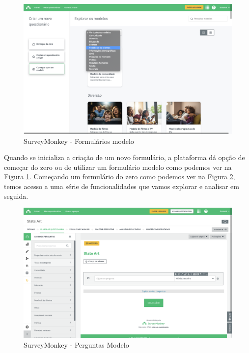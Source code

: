 \newpage

\begin{figure}[ht!]
	\begin{center}
		\includegraphics[width=1\textwidth]{img/sm/survey-form-create}
		\caption{SurveyMonkey - Formulários modelo }
		\label{fig:survey-form-create}
	\end{center}
\end{figure}

Quando se inicializa a criação de um novo formulário, a plataforma dá opção de começar do zero ou de utilizar um formulário modelo como podemos ver na Figura \ref{fig:survey-form-create}. Começando um formulário do zero como podemos ver na Figura \ref{fig:survey-form-banck2}, temos acesso a uma série de funcionalidades que vamos explorar e analisar em seguida.

\begin{figure}[ht!]
	\begin{center}
		\includegraphics[width=1\textwidth]{img/sm/survey-form-bank2}
		\caption{SurveyMonkey -  Perguntas Modelo}
		\label{fig:survey-form-banck2}
	\end{center}
\end{figure}


